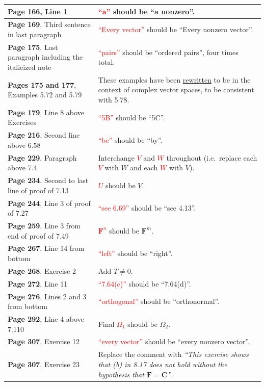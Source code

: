 \documentclass[10pt, a4paper]{article}
\newcommand{\red}[1]{\textcolor{red}{#1}}
\newcommand{\green}[1]{\textcolor{green!50!black}{#1}}
\begin{document}
\begin{longtable}{|R{.46\textwidth}|R{.50\textwidth}|}
	\textbf{Page 166}, Line 1 & \red{``a''} should be \green{``a nonzero''}. \\ \hline
	\textbf{Page 169}, Third sentence in last paragraph & \red{``Every vector''} should be \green{``Every nonzero vector''}. \\ \hline
	\textbf{Page 175}, Last paragraph including the italicized note & \red{``pairs''} should be \green{``ordered pairs''}, four times total. \\ \hline
	\textbf{Pages 175 and 177}, Examples 5.72 and 5.79 & These examples have been \href{https://linear.axler.net/LADR4e.pdf#page=189}{\faLink rewritten} to be in the context of complex vector spaces, to be consistent with 5.78. \\ \hline
	\textbf{Page 179}, Line 8 above Exercises & \red{``5B''} should be \green{``5C''}. \\ \hline
	\textbf{Page 216}, Second line above 6.58 & \red{``be''} should be \green{``by''}. \\ \hline
	\textbf{Page 229}, Paragraph above 7.4 & Interchange \red{$V$} and \red{$W$} throughout (i.e.\ replace each \red{$V$} with \green{$W$} and each \red{$W$} with \green{$V$}). \\ \hline
	\textbf{Page 234}, Second to last line of proof of 7.13 & \red{$U$} should be \green{$V$}. \\ \hline
	\textbf{Page 244}, Line 3 of proof of 7.27 & \red{``see 6.69''} should be \green{``see 4.13''}. \\ \hline
	\textbf{Page 259}, Line 3 from end of proof of 7.49 & \red{$\mathbf{F}^n$} should be \green{$\mathbf{F}^m$}. \\ \hline
	\textbf{Page 267}, Line 14 from bottom & \red{``left''} should be \green{``right''}. \\ \hline
	\textbf{Page 268}, Exercise 2 & Add \green{$T \neq 0$}. \\ \hline
	\textbf{Page 272}, Line 11 & \red{``7.64(c)''} should be \green{``7.64(d)''}. \\ \hline
	\textbf{Page 276}, Lines 2 and 3 from bottom & \red{``orthogonal''} should be \green{``orthonormal''}. \\ \hline
	\textbf{Page 292}, Line 4 above 7.110 & Final \red{$\Omega_1$} should be \green{$\Omega_2$}. \\ \hline
	\textbf{Page 307}, Exercise 12 & \red{``every vector''} should be \green{``every nonzero vector''}. \\ \hline
	\textbf{Page 307}, Exercise 23 & Replace the comment with \green{\textit{``This exercise shows that (b) in 8.17 does not hold without the hypothesis that $\mathbf{F}=\mathbf{C}$''}}. \\ \hline

\end{longtable}
\end{document}
